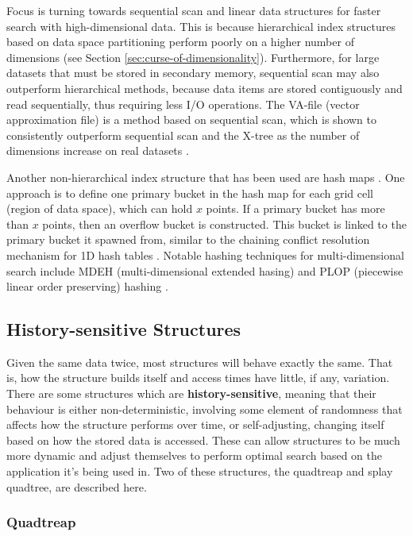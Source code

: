 Focus is turning towards sequential scan and linear data structures for faster search with high-dimensional data. This is because hierarchical index structures based on data space partitioning perform poorly on a higher number of dimensions (see Section \ref{sec:curse-of-dimensionality}). Furthermore, for large datasets that must be stored in secondary memory, sequential scan may also outperform hierarchical methods, because data items are stored contiguously and read sequentially, thus requiring less I/O operations. The VA-file (vector approximation file) is a method based on sequential scan, which is shown to consistently outperform sequential scan and the X-tree as the number of dimensions increase on real datasets \cite{va-file}.

Another non-hierarchical index structure that has been used are hash maps \cite{md-structures-samet}. One approach is to define one primary bucket in the hash map for each grid cell (region of data space), which can hold $x$ points. If a primary bucket has more than $x$ points, then an overflow bucket is constructed. This bucket is linked to the primary bucket it spawned from, similar to the chaining conflict resolution mechanism for 1D hash tables \cite{introduction-to-algorithms}. Notable hashing techniques for multi-dimensional search include MDEH (multi-dimensional extended hasing) and PLOP (piecewise linear order preserving) hashing \cite{md-structures-samet}.


\subsection{History-sensitive Structures}

Given the same data twice, most structures will behave exactly the same. That is, how the structure builds itself and access times have little, if any, variation. There are some structures which are \textbf{history-sensitive}, meaning that their behaviour is either non-deterministic, involving some element of randomness that affects how the structure performs over time, or self-adjusting, changing itself based on how the stored data is accessed. These can allow structures to be much more dynamic and adjust themselves to perform optimal search based on the application it's being used in. Two of these structures, the quadtreap and splay quadtree, are described here.

\subsubsection{Quadtreap}

